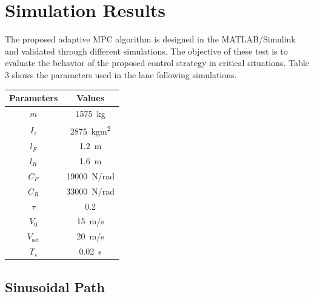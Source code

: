 \section{Simulation Results}
The proposed adaptive MPC algorithm is designed in the MATLAB/Simulink and validated through different simulations. The objective of these test is to evaluate the behavior of the proposed control strategy in critical situations.
Table 3 shows the parameters used in the lane following simulations.
\begin{table}[!h]
	\centering
	\begin{tabular}{|c|c|}
		\hline
		Parameters          & Values      \\
		\hline
		$m$          & \SI{1575}{kg}              \\
		$I_z$         & \SI{2875}{kgm^2}               \\
		$l_F$           & \SI{1.2}{m}               \\
		$l_R$         & \SI{1.6}{m}               \\
		$C_F$          & \SI{19000}{\newton/rad}      \\
		$C_R$           & \SI{33000}{\newton/rad}  \\
		$\tau$             & 0.2                \\
		$V_0$           & \SI{15}{m/s}       \\
		$V_{\text{set}}$          & \SI{20}{m/s}   \\
		$T_s$         & \SI{0.02}{s}          \\
		\hline
	\end{tabular}
\end{table}

\subsection{Sinusoidal Path}

